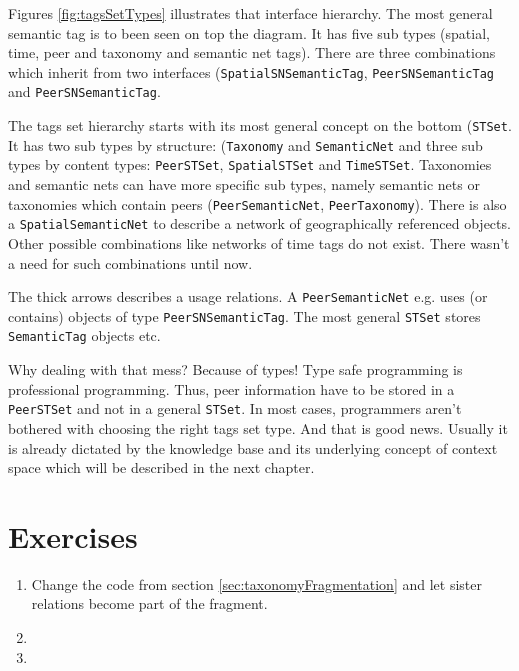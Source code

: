 Figures \ref{fig:tagsSetTypes} illustrates that interface hierarchy. The most general semantic tag is to been seen on top the diagram. It has five sub types (spatial, time, peer and taxonomy and semantic net tags). There are three combinations which inherit from two interfaces
({\tt SpatialSNSemanticTag}, {\tt PeerSNSemanticTag} and
{\tt PeerSNSemanticTag}.

The tags set hierarchy starts with its most general concept on the bottom ({\tt STSet}. It has two sub types by structure: ({\tt Taxonomy} and {\tt SemanticNet} and three sub types by content types: {\tt PeerSTSet}, {\tt SpatialSTSet} and {\tt TimeSTSet}. Taxonomies and semantic nets can have more specific sub types, namely semantic nets or taxonomies which contain peers ({\tt PeerSemanticNet}, {\tt PeerTaxonomy}). There is also a {\tt SpatialSemanticNet} to describe a network of geographically referenced objects. Other possible combinations like networks of time tags do not exist. There wasn't a need for such combinations until now.

The thick arrows describes a usage relations. A {\tt PeerSemanticNet} e.g. uses (or contains) objects of type {\tt PeerSNSemanticTag}. The most general {\tt STSet} stores {\tt SemanticTag} objects etc.

Why dealing with that mess? Because of types! Type safe programming is professional programming. Thus, peer information have to be stored in a {\tt PeerSTSet} and not in a general {\tt STSet}. In most cases, programmers aren't bothered with choosing the right tags set type. And that is good news. Usually it is already dictated by the knowledge base and its underlying concept of context space which will be described in the next chapter.

\section{Exercises}
\begin{enumerate}
\item
Change the code from section \ref{sec:taxonomyFragmentation} and let sister relations become part of the fragment.
\item
\item

\end{enumerate}
